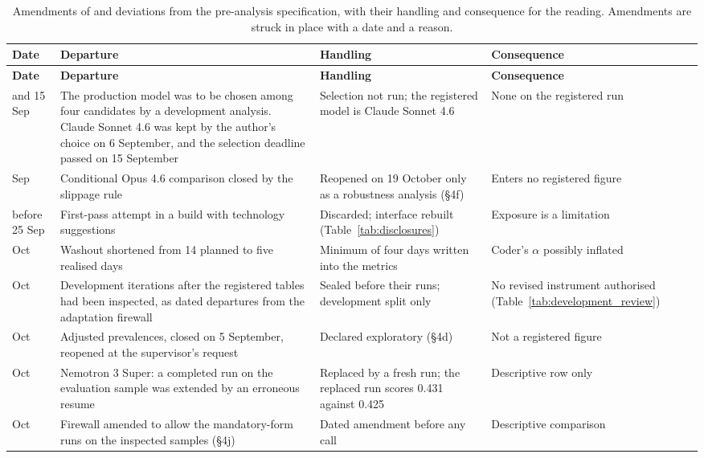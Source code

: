 \begingroup\scriptsize
\setlength{\tabcolsep}{4pt}
\begin{longtable}{@{}>{\raggedright\arraybackslash}p{16mm}>{\raggedright\arraybackslash}p{54mm}>{\raggedright\arraybackslash}p{42mm}>{\raggedright\arraybackslash}p{38mm}@{}}
\caption[Amendments and deviations]{Amendments of and deviations from the pre-analysis specification, with their handling and consequence for the reading. Amendments are struck in place with a date and a reason.}\label{tab:deviations} \\
\toprule
\textbf{Date} & \textbf{Departure} & \textbf{Handling} & \textbf{Consequence} \\
\midrule
\endfirsthead
\toprule
\textbf{Date} & \textbf{Departure} & \textbf{Handling} & \textbf{Consequence} \\
\midrule
\endhead
\bottomrule
\endfoot
6 and 15 Sep & The production model was to be chosen among four candidates by a development analysis. Claude Sonnet 4.6 was kept by the author's choice on 6 September, and the selection deadline passed on 15 September & Selection not run; the registered model is Claude Sonnet 4.6 & None on the registered run \\
24 Sep & Conditional Opus 4.6 comparison closed by the slippage rule & Reopened on 19 October only as a robustness analysis (\S4f) & Enters no registered figure \\
before 25 Sep & First-pass attempt in a build with technology suggestions & Discarded; interface rebuilt (Table~\ref{tab:disclosures}) & Exposure is a limitation \\
12 Oct & Washout shortened from 14 planned to five realised days & Minimum of four days written into the metrics & Coder's $\alpha$ possibly inflated \\
14 Oct & Development iterations after the registered tables had been inspected, as dated departures from the adaptation firewall & Sealed before their runs; development split only & No revised instrument authorised (Table~\ref{tab:development_review}) \\
19 Oct & Adjusted prevalences, closed on 5 September, reopened at the supervisor's request & Declared exploratory (\S4d) & Not a registered figure \\
19 Oct & Nemotron 3 Super: a completed run on the evaluation sample was extended by an erroneous resume & Replaced by a fresh run; the replaced run scores 0.431 against 0.425 & Descriptive row only \\
30 Oct & Firewall amended to allow the mandatory-form runs on the inspected samples (\S4j) & Dated amendment before any call & Descriptive comparison \\

\end{longtable}
